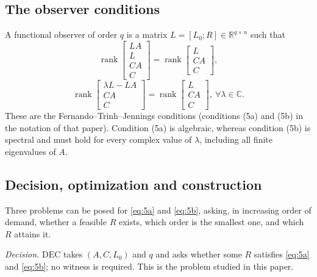 \documentclass[journal]{IEEEtran}
\theoremstyle{plainn}
\theoremstyle{remark}
\begin{document}
\subsection{The observer conditions}\label{sec:conditions}

A functional observer of order $q$ is a matrix $L=[L_0;R]\in\mathbb R^{q\times n}$ such
that
\begin{equation}\label{eq:5a}
\operatorname{rank}\begin{bmatrix}LA\\ L\\ CA\\ C\end{bmatrix}
=\operatorname{rank}\begin{bmatrix}L\\ CA\\ C\end{bmatrix},
\end{equation}
\begin{equation}\label{eq:5b}
\operatorname{rank}\begin{bmatrix}\lambda L-LA\\ CA\\ C\end{bmatrix}
=\operatorname{rank}\begin{bmatrix}L\\ CA\\ C\end{bmatrix},
\ \forall\lambda\in\mathbb C.
\end{equation}
These are the Fernando–Trinh–Jennings conditions \cite{fer10} (conditions (5a) and (5b) in the notation of that paper). 
Condition (5a) is algebraic, whereas condition (5b) is spectral and must hold for every complex value of $\lambda$, including all finite eigenvalues of $A$.

\subsection{Decision, optimization and construction}\label{sec:problems}

Three problems can be posed for \eqref{eq:5a} and \eqref{eq:5b}, asking, in increasing order of demand, whether a feasible $R$ exists, which order is the smallest one, and which $R$ attains it.

\emph{Decision.} $\mathrm{DEC}$ takes $(A,C,L_0)$ and $q$ and asks whether some $R$
satisfies \eqref{eq:5a} and \eqref{eq:5b}; no witness is required. This is the problem studied in this paper.
\end{document}
